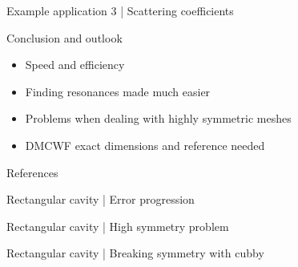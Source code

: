 \documentclass{beamer}
\begin{document}
\begin{frame}{Example application 3 | Scattering coefficients}

    \begin{figure}
        \centering
        \scalebox{0.8}{}
    \end{figure}

\end{frame}

\begin{frame}{Conclusion and outlook}

    \begin{itemize}
        \item<1-> Speed and efficiency
        \item<2-> Finding resonances made much easier
        \item<3-> Problems when dealing with highly symmetric meshes
        \item<4-> DMCWF exact dimensions and reference needed
    \end{itemize}

\end{frame}

\begin{frame}{References}
    
\end{frame}

\begin{frame}{Rectangular cavity | Error progression}
    \begin{figure}
        \centering
        \scalebox{0.8}{}
    \end{figure}
\end{frame}

\begin{frame}{Rectangular cavity | High symmetry problem}
    \begin{figure}
        \centering
        \scalebox{0.8}{}
    \end{figure}
\end{frame}

\begin{frame}{Rectangular cavity | Breaking symmetry with cubby}
    \begin{figure}
        \centering
        \scalebox{0.8}{}
    \end{figure}
\end{frame}
\end{document}
